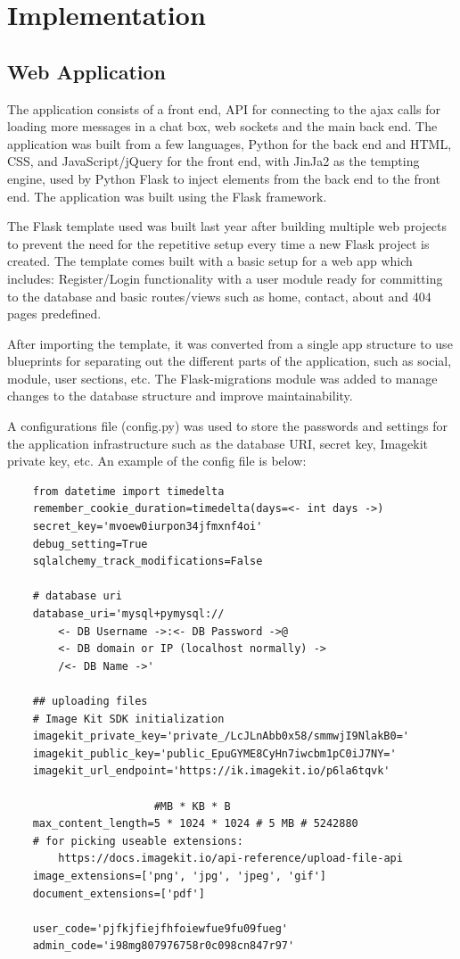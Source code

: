 \chapter{Implementation}

\section{Web Application}
The application consists of a front end, API for connecting to the ajax calls for loading more messages in a chat box, web sockets and the main back end. The application was built from a few languages, Python for the back end and HTML, CSS, and JavaScript/jQuery for the front end, with JinJa2 as the tempting engine, used by Python Flask to inject elements from the back end to the front end. The application was built using the Flask framework.

The Flask template \cite{flask_template_mine} used was built last year after building multiple web projects to prevent the need for the repetitive setup every time a new Flask project is created. The template comes built with a basic setup for a web app which includes: Register/Login functionality with a user module ready for committing to the database and basic routes/views such as home, contact, about and 404 pages predefined.  

After importing the template, it was converted from a single app structure to use blueprints for separating out the different parts of the application, such as social, module, user sections, etc. The Flask-migrations module was added to manage changes to the database structure and improve maintainability.

A configurations file (config.py) was used to store the passwords and settings for the application infrastructure such as the database URI, secret key, Imagekit private key, etc. An example of the config file is below:

\begin{lstlisting}
    from datetime import timedelta
    remember_cookie_duration=timedelta(days=<- int days ->)
    secret_key='mvoew0iurpon34jfmxnf4oi'
    debug_setting=True
    sqlalchemy_track_modifications=False
    
    # database uri
    database_uri='mysql+pymysql://
        <- DB Username ->:<- DB Password ->@
        <- DB domain or IP (localhost normally) ->
        /<- DB Name ->'
    
    ## uploading files
    # Image Kit SDK initialization
    imagekit_private_key='private_/LcJLnAbb0x58/smmwjI9NlakB0='
    imagekit_public_key='public_EpuGYME8CyHn7iwcbm1pC0iJ7NY='
    imagekit_url_endpoint='https://ik.imagekit.io/p6la6tqvk'
    
                       #MB * KB * B
    max_content_length=5 * 1024 * 1024 # 5 MB # 5242880
    # for picking useable extensions: 
        https://docs.imagekit.io/api-reference/upload-file-api
    image_extensions=['png', 'jpg', 'jpeg', 'gif']
    document_extensions=['pdf']
    
    user_code='pjfkjfiejfhfoiewfue9fu09fueg'
    admin_code='i98mg807976758r0c098cn847r97'

\end{lstlisting}

